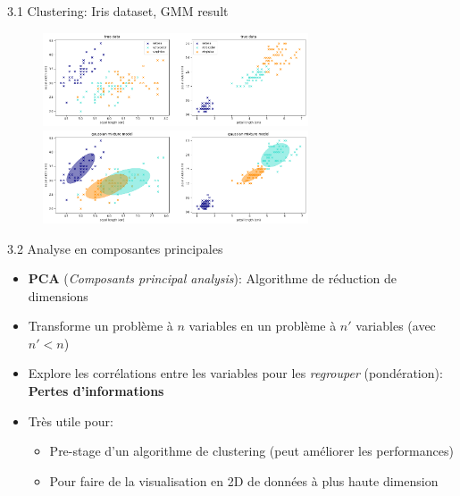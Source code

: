 \begin{frame}{3.1 Clustering: Iris dataset, GMM result}
  \begin{figure}
    \includegraphics[width=0.7\textwidth]{fig/clusteringTrue.png}
    \includegraphics[width=0.7\textwidth]{fig/clusteringGMM.png}
  \end{figure}
\end{frame}

\begin{frame}{3.2 Analyse en composantes principales}
  \begin{itemize}
  \item \textbf{PCA} (\textit{Composants principal analysis}): Algorithme de réduction de dimensions
  \item Transforme un problème à $n$ variables en un problème à $n'$ variables (avec $n' < n$)
  \item Explore les corrélations entre les variables pour les \textit{regrouper} (pondération): \textbf{Pertes d'informations}
  \item Très utile pour:
    \begin{itemize}
      \normalsize
    \item Pre-stage d'un algorithme de clustering (peut améliorer les performances)
    \item Pour faire de la visualisation en 2D de données à plus haute dimension
    \end{itemize}
  \end{itemize}
\end{frame}

